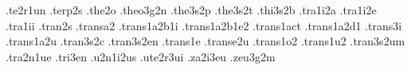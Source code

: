 {.te2r1un                          %
.terp2s                           %
.the2o
.theo3g2n                         %
.the3s2p                          %
.the3s2t                          %
.thi3s2b                          %
.tra1i2a .tra1i2e .tra1ii         %
.tran2s
.transa2
.trans1a2b1i                      %
.trans1a2b1e2                     %
.trans1act                        %
.trans1a2d1                       %
.trans3i                          %
.trans1a2u                        %
.tran3s2c                         %
.tran3s2en                        %
.trans1e .transe2u                %
.trans1o2                         %
.trans1u2                         %
.tran3s2um                        %
.tra2n1ue                         %
.tri3en                           %
.u2n1i2us                         %
.ute2r3ui                         %
.za2i3eu                          %
.zeu3g2m                          %
%
}
